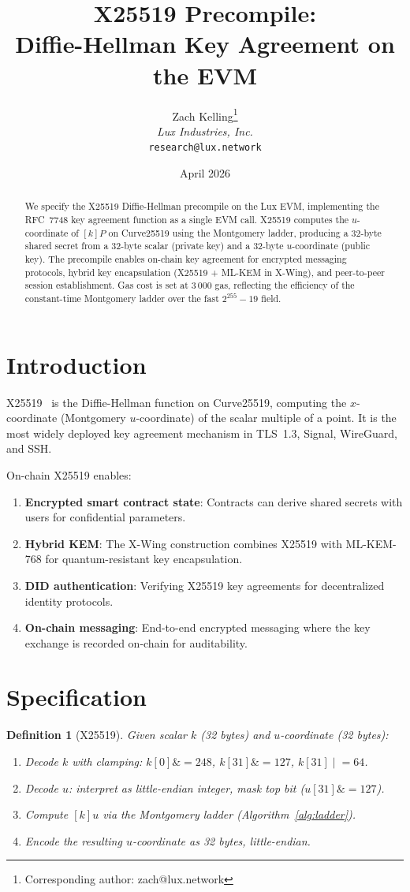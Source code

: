 \documentclass[11pt,a4paper]{article}
\title{X25519 Precompile:\\Diffie-Hellman Key Agreement on the EVM}
\author{
Zach Kelling\thanks{Corresponding author: zach@lux.network}\\
\textit{Lux Industries, Inc.}\\
\texttt{research@lux.network}
}
\date{April 2026}
\newtheorem{definition}{Definition}
\begin{document}
\luxcoverpage

\begin{abstract}
We specify the X25519 Diffie-Hellman precompile on the Lux EVM, implementing
the RFC~7748 key agreement function as a single EVM call. X25519 computes the
$u$-coordinate of $[k]P$ on Curve25519 using the Montgomery ladder, producing a
32-byte shared secret from a 32-byte scalar (private key) and a 32-byte
$u$-coordinate (public key). The precompile enables on-chain key agreement for
encrypted messaging protocols, hybrid key encapsulation (X25519 + ML-KEM in X-Wing),
and peer-to-peer session establishment. Gas cost is set at 3\,000 gas, reflecting the
efficiency of the constant-time Montgomery ladder over the fast $2^{255}-19$ field.
\end{abstract}

\section{Introduction}

X25519~\cite{rfc7748} is the Diffie-Hellman function on Curve25519, computing
the $x$-coordinate (Montgomery $u$-coordinate) of the scalar multiple of a
point. It is the most widely deployed key agreement mechanism in TLS~1.3,
Signal, WireGuard, and SSH.

On-chain X25519 enables:
\begin{enumerate}[label=(\roman*)]
  \item \textbf{Encrypted smart contract state}: Contracts can derive shared
    secrets with users for confidential parameters.
  \item \textbf{Hybrid KEM}: The X-Wing construction combines X25519 with
    ML-KEM-768 for quantum-resistant key encapsulation.
  \item \textbf{DID authentication}: Verifying X25519 key agreements for
    decentralized identity protocols.
  \item \textbf{On-chain messaging}: End-to-end encrypted messaging where
    the key exchange is recorded on-chain for auditability.
\end{enumerate}

\section{Specification}

\begin{definition}[X25519]
Given scalar $k$ (32 bytes) and $u$-coordinate (32 bytes):
\begin{enumerate}
  \item Decode $k$ with clamping: $k[0] \mathrel{\&}= 248$, $k[31] \mathrel{\&}= 127$,
    $k[31] \mathrel{|}= 64$.
  \item Decode $u$: interpret as little-endian integer, mask top bit ($u[31] \mathrel{\&}= 127$).
  \item Compute $[k]u$ via the Montgomery ladder (Algorithm~\ref{alg:ladder}).
  \item Encode the resulting $u$-coordinate as 32 bytes, little-endian.
\end{enumerate}
\end{definition}
\end{document}
